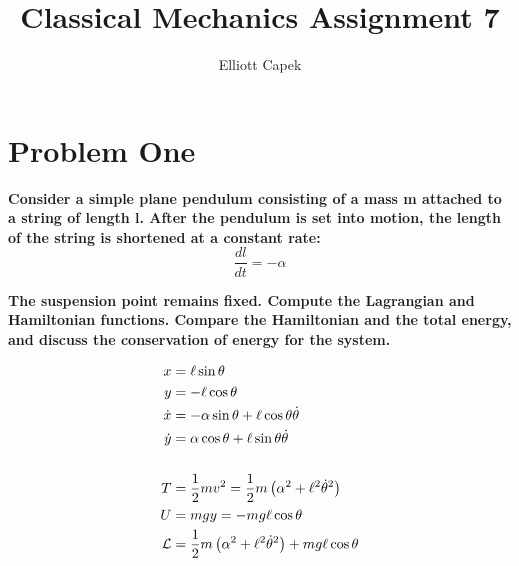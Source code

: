 \documentclass[10pt]{article} %
\title{Classical Mechanics Assignment 7}
\author{Elliott Capek}
\begin{document}
\maketitle{}

\section{Problem One}
\textbf{Consider a simple plane pendulum consisting of a mass m attached to a string of length l. After the pendulum is set into motion, the length of the string is shortened at a constant rate:}
\begin{equation}
  \frac{dl}{dt} = −\alpha
\end{equation}

\textbf{The suspension point remains fixed. Compute the Lagrangian and Hamiltonian functions. Compare the Hamiltonian and the total energy, and discuss the conservation of energy for the system.}

\begin{align*}
  x &= \ell\sin\theta\\
  y &= -\ell\cos\theta\\
  \dot{x} &= -\alpha\sin\theta + \ell\cos\theta\dot{\theta}\\
  \dot{y} &= \alpha\cos\theta + \ell\sin\theta\dot{\theta}\\
  \vspace{1cm}\\
  T &= \frac{1}{2}mv^2 = \frac{1}{2}m\left(\alpha^2+\ell^2\dot{\theta}^2\right)\\
  U &= mgy = -mg\ell\cos\theta\\
  \mathcal{L} &= \frac{1}{2}m\left(\alpha^2+\ell^2\dot{\theta}^2\right) + mg\ell\cos\theta\\
\end{align*}
\end{document}
